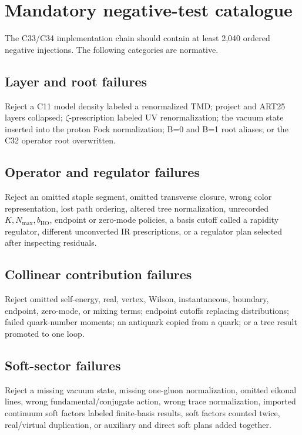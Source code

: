 \documentclass[11pt]{article}
\newcommand{\TMD}{\ensuremath{\mathrm{TMD}}}
\begin{document}
\section{Mandatory negative-test catalogue}
\label{sec:negative-tests}

The C33/C34 implementation chain should contain at least 2,040 ordered negative injections.  The following categories are normative.

\subsection{Layer and root failures}

Reject a C11 model density labeled a renormalized \TMD; project and ART25 layers collapsed; \(\zeta\)-prescription labeled UV renormalization; the vacuum state inserted into the proton Fock normalization; B=0 and B=1 root aliases; or the C32 operator root overwritten.

\subsection{Operator and regulator failures}

Reject an omitted staple segment, omitted transverse closure, wrong color representation, lost path ordering, altered tree normalization, unrecorded \(K,N_{\max},b_{\mathrm{HO}}\), endpoint or zero-mode policies, a basis cutoff called a rapidity regulator, different unconverted IR prescriptions, or a regulator plan selected after inspecting residuals.

\subsection{Collinear contribution failures}

Reject omitted self-energy, real, vertex, Wilson, instantaneous, boundary, endpoint, zero-mode, or mixing terms; endpoint cutoffs replacing distributions; failed quark-number moments; an antiquark copied from a quark; or a tree result promoted to one loop.

\subsection{Soft-sector failures}

Reject a missing vacuum state, missing one-gluon normalization, omitted eikonal lines, wrong fundamental/conjugate action, wrong trace normalization, imported continuum soft factors labeled finite-basis results, soft factors counted twice, real/virtual duplication, or auxiliary and direct soft plans added together.
\end{document}
